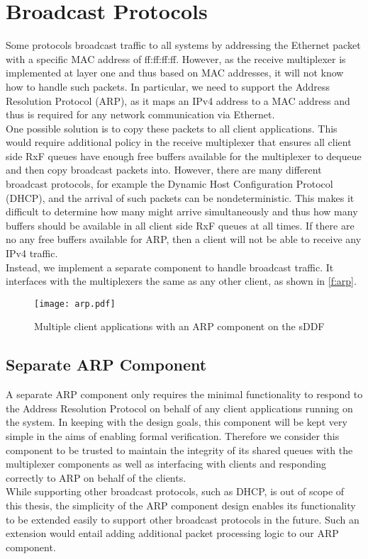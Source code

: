 \section{Broadcast Protocols}\label{s:arp}
Some protocols broadcast traffic to all systems by addressing the
Ethernet packet with a specific MAC address of ff:ff:ff:ff. However,
as the receive multiplexer is implemented at layer one and thus based on MAC addresses,
it will not know how to handle such packets. In particular, we need to support 
the Address Resolution Protocol (ARP), as it maps an
IPv4 address to a MAC address and thus 
is required for any network communication via Ethernet.\\
One possible solution is to copy these packets to all client applications.
This would require additional policy in the receive multiplexer that ensures
all client side RxF queues have enough free buffers available
for the multiplexer to dequeue and then copy broadcast packets into.
However, there are many different broadcast protocols, for example the Dynamic
Host Configuration Protocol (DHCP), and the arrival of such packets
can be nondeterministic. This makes it difficult to determine how many might arrive
simultaneously and thus how many buffers should be available in all client side
RxF queues at all times. If there are no any free buffers available for ARP, then
a client will not be able to receive any IPv4 traffic.\\
Instead, we implement a separate component to handle broadcast traffic. It interfaces
with the multiplexers the same as any other client, as shown in \autoref{f:arp}. 

\begin{figure}[h]
    \centering
    \texttt{[image: arp.pdf]}
    \caption{Multiple client applications with an ARP component on the sDDF}
    \label{f:arp}
\end{figure}

\subsection{Separate ARP Component}\label{s:arp_design}
A separate ARP component only requires the minimal functionality to respond to 
the Address Resolution Protocol on behalf of any client applications running on
the system. In keeping with the design goals, this component will be kept 
very simple in the aims of enabling formal verification. Therefore we consider
this component to be trusted to maintain the integrity of its shared queues with
the multiplexer components as well as interfacing with clients and responding
correctly to ARP on behalf of the clients. \\
While supporting other broadcast protocols, such as DHCP, is out of scope of this thesis, 
the simplicity of the ARP component design enables its functionality to be extended easily
to support other broadcast protocols in the future. Such an extension would entail 
adding additional packet processing logic to our ARP component. 


